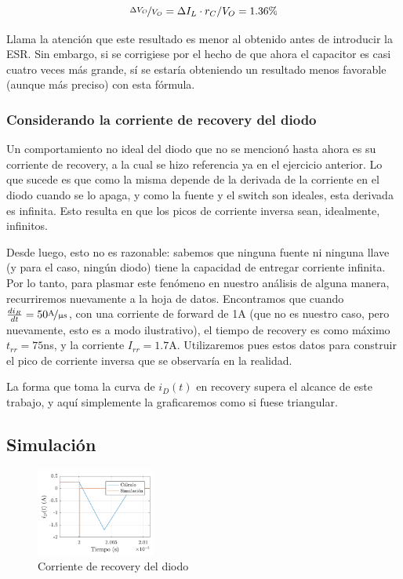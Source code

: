 \documentclass[e4_tp1_main.tex]{subfiles}
\begin{document}
\begin{equation}
	\nicefrac{\Delta V_O}{V_O} = \Delta I_L \cdot r_C/V_O = 1.36 \%
	\label{eq:result-ripple-esr}
\end{equation}

Llama la atenci\'on que este resultado es menor al obtenido antes de introducir la ESR. Sin embargo, si se corrigiese por el hecho de que ahora el capacitor es casi cuatro veces m\'as grande, s\'i se estar\'ia obteniendo un resultado menos favorable (aunque m\'as preciso) con esta f\'ormula.


\subsubsection{Considerando la corriente de recovery del diodo}

Un comportamiento no ideal del diodo que no se mencion\'o hasta ahora es su corriente de recovery, a la cual se hizo referencia ya en el ejercicio anterior. Lo que sucede es que como la misma depende de la derivada de la corriente en el diodo cuando se lo apaga, y como la fuente y el switch son ideales, esta derivada es infinita. Esto resulta en que los picos de corriente inversa sean, idealmente, infinitos.

Desde luego, esto no es razonable: sabemos que ninguna fuente ni ninguna llave (y para el caso, ning\'un diodo) tiene la capacidad de entregar corriente infinita. Por lo tanto, para plasmar este fen\'omeno  en nuestro an\'alisis de alguna manera, recurriremos nuevamente a la hoja de datos. Encontramos que cuando $\frac{di_R}{dt} = 50\nicefrac{\text{A}}{\upmu \text{s}}$, con una corriente de forward de 1A (que no es nuestro caso, pero nuevamente, esto es a modo ilustrativo), el tiempo de recovery es como m\'aximo $t_{rr}=75$ns, y la corriente $I_{rr} = 1.7$A. Utilizaremos pues estos datos para construir el pico de corriente inversa que se observar\'ia en la realidad.

La forma que toma la curva de $i_D(t)$ en recovery supera el alcance de este trabajo, y aqu\'i simplemente la graficaremos como si fuese triangular. 



\subsection{Simulaci\'on}

\begin{figure}
	\centering
	\includegraphics[width=0.35\textwidth]{images/ej2/id-recovery.pdf}
	\caption{Corriente de recovery del diodo}
	\label{fig:id-recovery}
\end{figure}
\end{document}
